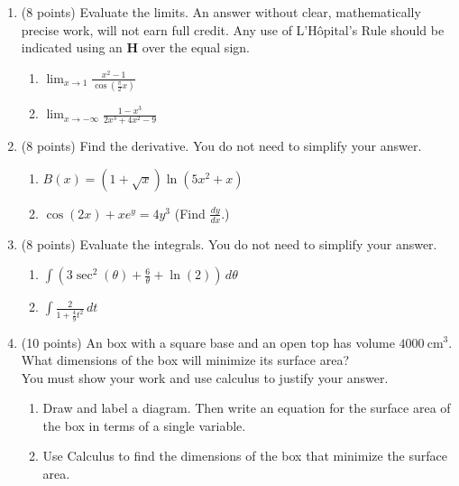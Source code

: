 \documentclass[12pt]{article}
\begin{document}
\newpage
\begin{enumerate}
\item (8 points) Evaluate the limits. An answer without clear, mathematically precise work, will not earn full credit. Any use of L'H\^{o}pital's Rule should be indicated using an \textbf{H} over the equal sign.
	\begin{enumerate}
	\item $\displaystyle \lim_{x \to 1} \frac{x^2-1}{\cos(\frac{\pi}{2} x)}$
	\vfill
	\item $\displaystyle \lim_{x \to -\infty} \frac{1-x^3}{2x^3+4x^2-9}$
	\vfill
	\end{enumerate}
\item (8 points) Find the derivative. You do not need to simplify your answer.
	\begin{enumerate}
	\item $\displaystyle B(x)=(1+\sqrt{x})\ln(5x^2+x)$
	\vfill
	\item $\displaystyle \cos(2x)+xe^y=4y^3$ (Find $\displaystyle \frac{dy}{dx}.$)
	\vfill
	\end{enumerate}
\newpage
\item (8 points) Evaluate the integrals. You do not need to simplify your answer.
	\begin{enumerate}
	\item $\displaystyle \int (3\sec^2(\theta) + \frac{6}{\theta}+\ln(2))\, d\theta$
	\vfill
	\item $\displaystyle \int \frac{2}{1+\frac{4}{9}t^2} \, dt $
	\vfill
	\end{enumerate}
\newpage
\item (10 points) An box with a square base and an open top has volume $4000\:  \text{cm}^3.$ What dimensions of the box will minimize its surface area?\\
You must show your work and use calculus to justify your answer.\\
	\begin{enumerate}
\item Draw and label a diagram. Then write an equation for the surface area of the box in terms of a single variable. \\
\vspace{2.5in}
\item Use Calculus to find the dimensions of the box that minimize the surface area.
\vfill
	\end{enumerate}

\end{enumerate}
\end{document}
